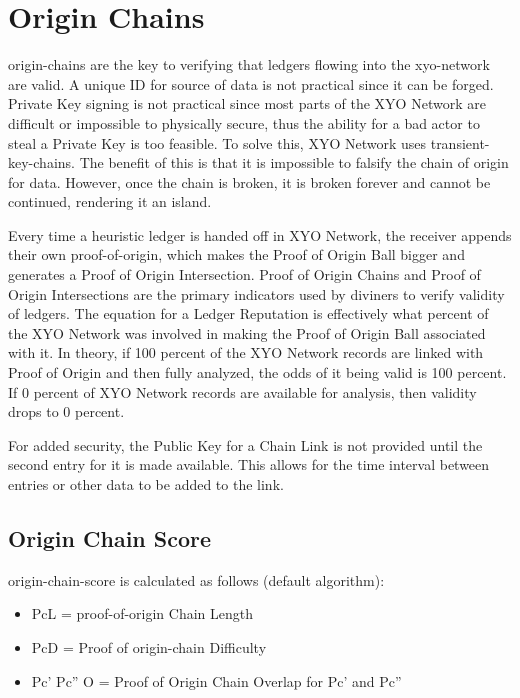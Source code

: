 \documentclass{article}
\begin{document}
\section {Origin Chains}
\Glspl{origin-chain} are the key to verifying that ledgers flowing into the \Gls{xyo-network} are valid. A unique ID for source of data is not practical since it can be forged. Private Key signing is not practical since most parts of the XYO Network are difficult or impossible to physically secure, thus the ability for a bad actor to steal a Private Key is too feasible. To solve this, XYO Network uses \Glspl{transient-key-chain}. The benefit of this is that it is impossible to falsify the chain of origin for data. However, once the chain is broken, it is broken forever and cannot be continued, rendering it an island.

Every time a \gls{heuristic} ledger is handed off in XYO Network, the receiver appends their own \Gls{proof-of-origin}, which makes the Proof of Origin Ball bigger and generates a Proof of Origin Intersection. Proof of Origin Chains and Proof of Origin Intersections are the primary indicators used by \Glspl{diviner} to verify validity of ledgers. The equation for a Ledger Reputation is effectively what percent of the XYO Network was involved in making the Proof of Origin Ball associated with it. In theory, if 100 percent of the XYO Network records are linked with Proof of Origin and then fully analyzed, the odds of it being valid is 100 percent. If 0 percent of XYO Network records are available for analysis, then validity drops to 0 percent.

For added security, the Public Key for a Chain Link is not provided until the second entry for it is made available. This allows for the time interval between entries or other data to be added to the link.

\subsection {Origin Chain Score}
\Gls{origin-chain-score} is calculated as follows (default algorithm):

\begin{itemize}
\item PcL = \Gls{proof-of-origin} Chain Length
\item PcD = Proof of \Gls{origin-chain} Difficulty
\item Pc' Pc'' O = Proof of Origin Chain Overlap for Pc' and Pc''
\end{itemize}
\end{document}
